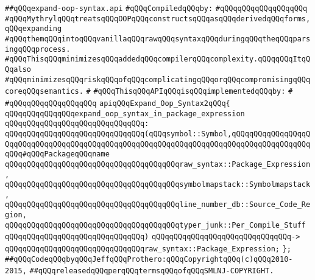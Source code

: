 \label{src/lib/compiler/front/typer/main/expand-oop-syntax2.api}
\verb|##qQQqexpand-oop-syntax.api|\newline
\newline
\verb|#qQQqCompiledqQQqby:|\newline
\verb|#qQQqqQQqqQQqqQQqqQQq|\newline
\newline
\verb|#qQQqMythrylqQQqtreatsqQQqOOPqQQqconstructsqQQqasqQQqderivedqQQqforms,qQQqexpanding|\newline
\verb|#qQQqthemqQQqintoqQQqvanillaqQQqrawqQQqsyntaxqQQqduringqQQqtheqQQqparsingqQQqprocess.|\newline
\verb|#qQQqThisqQQqminimizesqQQqaddedqQQqcompilerqQQqcomplexity.qQQqqQQqItqQQqalso|\newline
\verb|#qQQqminimizesqQQqriskqQQqofqQQqcomplicatingqQQqorqQQqcompromisingqQQqcoreqQQqsemantics.|\newline
\verb|#|\newline
\verb|#qQQqThisqQQqAPIqQQqisqQQqimplementedqQQqby:|\newline
\verb|#|\newline
\verb|#qQQqqQQqqQQqqQQqqQQq|\newline
\newline
\newline
\verb|apiqQQqExpand_Oop_Syntax2qQQq{|\newline
\newline
\verb|qQQqqQQqqQQqqQQqexpand_oop_syntax_in_package_expression|\newline
\verb|qQQqqQQqqQQqqQQqqQQqqQQqqQQqqQQq:|\newline
\verb|qQQqqQQqqQQqqQQqqQQqqQQqqQQqqQQq(qQQqsymbol::Symbol,qQQqqQQqqQQqqQQqqQQqqQQqqQQqqQQqqQQqqQQqqQQqqQQqqQQqqQQqqQQqqQQqqQQqqQQqqQQqqQQqqQQqqQQqqQQq#qQQqPackageqQQqname|\newline
\verb|qQQqqQQqqQQqqQQqqQQqqQQqqQQqqQQqqQQqqQQqraw_syntax::Package_Expression,|\newline
\verb|qQQqqQQqqQQqqQQqqQQqqQQqqQQqqQQqqQQqqQQqsymbolmapstack::Symbolmapstack,|\newline
\verb|qQQqqQQqqQQqqQQqqQQqqQQqqQQqqQQqqQQqqQQqline_number_db::Source_Code_Region,|\newline
\verb|qQQqqQQqqQQqqQQqqQQqqQQqqQQqqQQqqQQqqQQqtyper_junk::Per_Compile_Stuff|\newline
\verb|qQQqqQQqqQQqqQQqqQQqqQQqqQQqqQQq)|\newline
\verb|qQQqqQQqqQQqqQQqqQQqqQQqqQQqqQQq->|\newline
\verb|qQQqqQQqqQQqqQQqqQQqqQQqqQQqqQQqraw_syntax::Package_Expression;|\newline
\verb|};|\newline
\newline
\newline
\verb|##qQQqCodeqQQqbyqQQqJeffqQQqProthero:qQQqCopyrightqQQq(c)qQQq2010-2015,|\newline
\verb|##qQQqreleasedqQQqperqQQqtermsqQQqofqQQqSMLNJ-COPYRIGHT.|\newline

